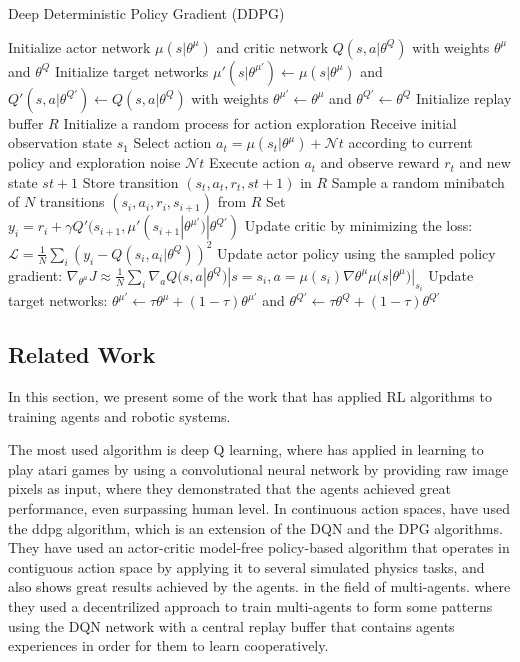 \documentclass[12pt]{extarticle}
\begin{document}
 
\begin{algorithm}[H]
\caption{Deep Deterministic Policy Gradient (DDPG)}
\label{alg:ddpg}
\begin{algorithmic}[1]
\State Initialize actor network $\mu(s|\theta^\mu)$ and critic network $Q(s,a|\theta^Q)$ with weights $\theta^\mu$ and $\theta^Q$
\State Initialize target networks $\mu'(s|\theta^{\mu'}) \leftarrow \mu(s|\theta^\mu)$ and $Q'(s,a|\theta^{Q'}) \leftarrow Q(s,a|\theta^Q)$ with weights $\theta^{\mu'} \leftarrow \theta^\mu$ and $\theta^{Q'} \leftarrow \theta^Q$
\State Initialize replay buffer $R$
\State Initialize a random process for action exploration
\State Receive initial observation state $s_1$
\State Select action $a_t = \mu(s_t|\theta^\mu) + \mathcal{N}t$ according to current policy and exploration noise $\mathcal{N}t$
\State Execute action $a_t$ and observe reward $r_t$ and new state $s{t+1}$
\State Store transition $(s_t, a_t, r_t, s{t+1})$ in $R$
\State Sample a random minibatch of $N$ transitions $(s_i, a_i, r_i, s_{i+1})$ from $R$
\State Set $y_i = r_i + \gamma Q'(s_{i+1},\mu'(s_{i+1}|\theta^{\mu'})|\theta^{Q'})$
\State Update critic by minimizing the loss: $\mathcal{L} = \frac{1}{N}\sum_i(y_i - Q(s_i,a_i|\theta^Q))^2$
\State Update actor policy using the sampled policy gradient: $\nabla_{\theta^\mu} J \approx \frac{1}{N}\sum_i \nabla_a Q(s,a|\theta^Q)|{s=s_i,a=\mu(s_i)} \nabla{\theta^\mu} \mu(s|\theta^\mu)|_{s_i}$
\State Update target networks: $\theta^{\mu'} \leftarrow \tau \theta^\mu + (1-\tau)\theta^{\mu'}$ and $\theta^{Q'} \leftarrow \tau \theta^Q + (1-\tau)\theta^{Q'}$
\EndFor
\EndFor
\end{algorithmic}
\end{algorithm}



\subsection{Related Work}
In this section, we present some of the work that has applied RL algorithms to training agents and robotic systems.

The most used algorithm is deep Q learning, where \cite{mnih2013playing} has applied  in learning to play atari games by using a convolutional neural network by providing raw image pixels as input, where they demonstrated that the agents achieved great performance, even surpassing human level.
In continuous action spaces, \cite{lillicrap2015continuous} have used the ddpg algorithm, which is an extension of the DQN and the DPG algorithms. They have used an actor-critic model-free policy-based algorithm that operates in contiguous action space by applying it to several simulated physics tasks, and also shows great results achieved by the agents.
in the field of multi-agents. \cite{diallo2020multi} where they used a decentrilized approach to train multi-agents to form some patterns using the DQN network with a central replay buffer that contains agents experiences in order for them to learn cooperatively.
\end{document}

